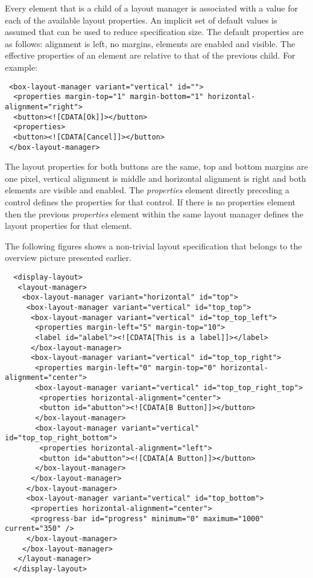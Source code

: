 \documentclass{article}
\begin{document}
   Every element that is a child of a layout manager is associated with a value
   for each of the available layout properties. An implicit set of default
   values is assumed that can be used to reduce specification size.
   The default properties are as follows: alignment is left, no margins,
   elements are enabled and visible. The effective properties of an element are
   relative to that of the previous child. For example:

   \enlargethispage{-\baselineskip}

   \small \begin{verbatim}
 <box-layout-manager variant="vertical" id="">
  <properties margin-top="1" margin-bottom="1" horizontal-alignment="right">
  <button><![CDATA[Ok]]></button>
  <properties>
  <button><![CDATA[Cancel]]></button>
 </box-layout-manager>\end{verbatim} \normalsize

   \noindent The layout properties for both buttons are the same, top and bottom margins
   are one pixel, vertical alignment is middle and horizontal alignment is right
   and both elements are visible and enabled. The \textit{properties} element
   directly preceding a control defines the properties for that control. If
   there is no properties element then the previous \textit{properties} element
   within the same layout manager defines the layout properties for that
   element.

   The following figures shows a non-trivial layout specification that belongs
   to the overview picture presented earlier.

   \small \begin{verbatim}
  <display-layout>
   <layout-manager>
    <box-layout-manager variant="horizontal" id="top">
     <box-layout-manager variant="vertical" id="top_top">
      <box-layout-manager variant="vertical" id="top_top_left">
       <properties margin-left="5" margin-top="10">
       <label id="alabel"><![CDATA[This is a label]]></label>
      </box-layout-manager>
      <box-layout-manager variant="vertical" id="top_top_right">
       <properties margin-left="0" margin-top="0" horizontal-alignment="center">
       <box-layout-manager variant="vertical" id="top_top_right_top">
        <properties horizontal-alignment="center">
        <button id="abutton"><![CDATA[B Button]]></button>
       </box-layout-manager>
       <box-layout-manager variant="vertical" id="top_top_right_bottom">
        <properties horizontal-alignment="left">
        <button id="abutton"><![CDATA[A Button]]></button>
       </box-layout-manager>
      </box-layout-manager>
     </box-layout-manager>
     <box-layout-manager variant="vertical" id="top_bottom">
      <properties horizontal-alignment="center">
      <progress-bar id="progress" minimum="0" maximum="1000" current="350" />
     </box-layout-manager>
    </box-layout-manager>
   </layout-manager>
  </display-layout>\end{verbatim} \normalsize
\end{document}
